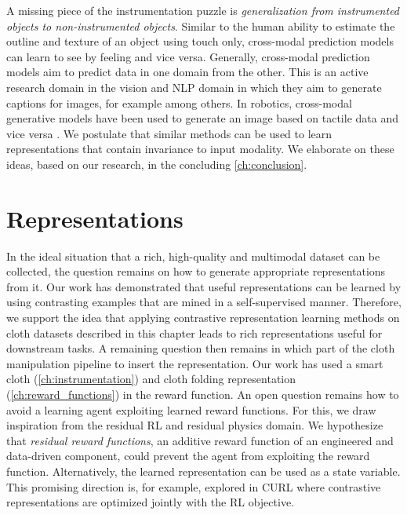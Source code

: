 \documentclass[\home/main.tex]{subfiles}
\begin{document}
A missing piece of the instrumentation puzzle is \emph{generalization from instrumented objects to non-instrumented objects}. Similar to the human ability to estimate the outline and texture of an object using touch only, cross-modal prediction models can learn to see by feeling and vice versa. Generally, cross-modal prediction models aim to predict data in one domain from the other. This is an active research domain in the vision and NLP domain in which they aim to generate captions for images, for example \autocite{donahue2015long} among others. In robotics, cross-modal generative models have been used to generate an image based on tactile data and vice versa \autocite{Li2019}. We postulate that similar methods can be used to learn representations that contain invariance to input modality. We elaborate on these ideas, based on our research, in the concluding \cref{ch:conclusion}. 

\section{Representations} \label{sec:towards_sensing_representation}

In the ideal situation that a rich, high-quality and multimodal dataset can be collected, the question remains on how to generate appropriate representations from it. Our work has demonstrated that useful representations can be learned by using contrasting examples that are mined in a self-supervised manner. Therefore, we support the idea that applying contrastive representation learning methods on cloth datasets described in this chapter leads to rich representations useful for downstream tasks. A remaining question then remains in which part of the cloth manipulation pipeline to insert the representation. Our work has used a smart cloth (\cref{ch:instrumentation}) and cloth folding representation (\cref{ch:reward_functions}) in the reward function. An open question remains how to avoid a learning agent exploiting learned reward functions. For this, we draw inspiration from the residual RL and residual physics domain. We hypothesize that \emph{residual reward functions}, an additive reward function of an engineered and data-driven component, could prevent the agent from exploiting the reward function. Alternatively, the learned representation can be used as a state variable. This promising direction is, for example, explored in CURL \autocite{Srinivas2020CURL} where contrastive representations are optimized jointly with the RL objective. 
\end{document}
